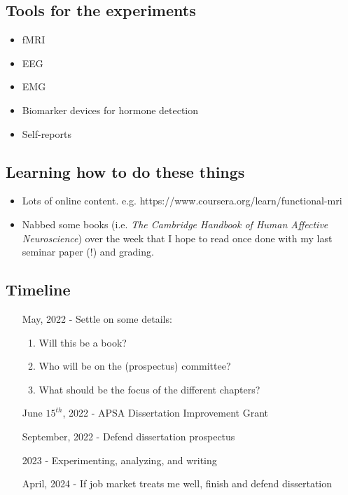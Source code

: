 \documentclass[12pt]{article}
\begin{document}
\subsection{Tools for the experiments}
\begin{itemize}
    \item fMRI 
    \item EEG
    \item EMG
    \item Biomarker devices for hormone detection
    \item Self-reports
\end{itemize}

\subsection{Learning how to do these things}
\begin{itemize}
    \item Lots of online content. e.g. https://www.coursera.org/learn/functional-mri
    \item Nabbed some books (i.e. \textit{The Cambridge Handbook of Human Affective Neuroscience}) over the week that I hope to read once done with my last seminar paper (!) and grading.
\end{itemize}

\subsection{Timeline}
\begin{itemize}
\item[May, 2022 - ] Settle on some details:
    \begin{enumerate}
        \item Will this be a book?
        \item Who will be on the (prospectus) committee?
        \item What should be the focus of the different chapters?
    \end{enumerate}
\item[June $15^{th}$, 2022 - ] APSA Dissertation Improvement Grant  
\item[September, 2022 - ] Defend dissertation prospectus
\item[2023 - ] Experimenting, analyzing, and writing
\item[April, 2024 - ] If job market treats me well, finish and defend dissertation
\end{itemize}
\end{document}

